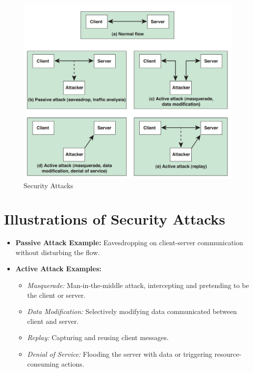 \begin{figure}[h!]
    \centering
    \includegraphics[width=\linewidth]{Data_Privacy_and_Cryptography/Figures/security_attacks.jpeg}
    \caption{Security Attacks}
    \label{fig:security_attacks}
\end{figure}

\section{Illustrations of Security Attacks}
\begin{itemize}
    \item \textbf{Passive Attack Example:} Eavesdropping on client-server communication without disturbing the flow.
    \item \textbf{Active Attack Examples:}
    \begin{itemize}
        \item \textit{Masquerade:} Man-in-the-middle attack, intercepting and pretending to be the client or server.
        \item \textit{Data Modification:} Selectively modifying data communicated between client and server.
        \item \textit{Replay:} Capturing and reusing client messages.
        \item \textit{Denial of Service:} Flooding the server with data or triggering resource-consuming actions.
    \end{itemize}
\end{itemize}
